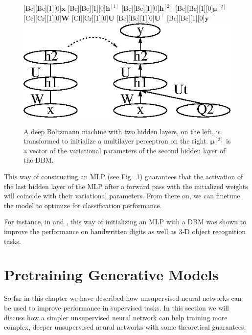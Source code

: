 \documentclass{now}
\newcommand{\qlay}[1]{\left[#1\right]}
\newcommand{\vect}[1]{\mathbf{#1}}
\newcommand{\vects}[1]{\boldsymbol{#1}}
\newcommand{\matr}[1]{\mathbf{#1}}
\newcommand{\vh}[0]{\vect{h}}
\newcommand{\vx}[0]{\vect{x}}
\newcommand{\vy}[0]{\vect{y}}
\newcommand{\mW}[0]{\matr{W}}
\newcommand{\mU}[0]{\matr{U}}
\newcommand{\vmu}[0]{\vects{\mu}}
\begin{document}
\begin{figure}[t]
    \centering
    [Bc][Bc][1][0]{$\vx$}
    [Bc][Bc][1][0]{$\vh^{\qlay{1}}$}
    [Bc][Bc][1][0]{$\vh^{\qlay{2}}$}
    [Bc][Bc][1][0]{$\vmu^{\qlay{2}}$}
    [Cc][Cr][1][0]{$\mW$}
    [Cl][Cr][1][0]{$\mU$}
    [Bc][Bc][1][0]{$\mU^\top$}
    [Bc][Bc][1][0]{$\vy$}
    \includegraphics[width=0.75\columnwidth]{../figures/dbm_mlp.eps}
    \caption{A deep Boltzmann machine with two hidden
    layers, on the left, is transformed to initialize a
    multilayer perceptron on the right. $\vmu^{\qlay{2}}$ is a
    vector of the variational parameters of the second
    hidden layer of the DBM.}
    \label{fig:dbm_mlp}
\end{figure}

This way of constructing an MLP (see Fig.~\ref{fig:dbm_mlp})
guarantees that the activation of the last hidden layer of
the MLP after a forward pass with the initialized weights
will coincide with their variational parameters. From there
on, we can finetune the model to optimize for classification
performance.

For instance, in \citep{Salakhutdinov2009a} and
\citep{Hinton2012}, this way of initializing an MLP with a
DBM was shown to improve the performance on handwritten
digits as well as 3-D object recognition tasks.





\section{Pretraining Generative Models}
\label{sec:pretrain_gen}


So far in this chapter we have described how 
unsupervised neural networks can be used to improve 
performance in supervised tasks. In this section we will
discuss how a simpler unsupervised neural network can help
training more complex, deeper unsupervised neural networks
with some theoretical guarantees.
\end{document}
